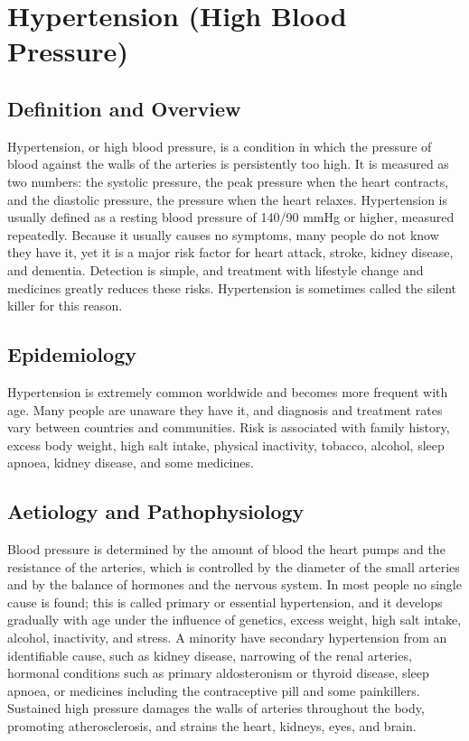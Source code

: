 \chapter{Hypertension (High Blood Pressure)}

\section*{Definition and Overview}
Hypertension, or high blood pressure, is a condition in which the pressure of blood against the walls of the arteries is persistently too high. It is measured as two numbers: the systolic pressure, the peak pressure when the heart contracts, and the diastolic pressure, the pressure when the heart relaxes. Hypertension is usually defined as a resting blood pressure of 140/90 mmHg or higher, measured repeatedly. Because it usually causes no symptoms, many people do not know they have it, yet it is a major risk factor for heart attack, stroke, kidney disease, and dementia. Detection is simple, and treatment with lifestyle change and medicines greatly reduces these risks. Hypertension is sometimes called the silent killer for this reason.

\section*{Epidemiology}
Hypertension is extremely common worldwide and becomes more frequent with age. Many people are unaware they have it, and diagnosis and treatment rates vary between countries and communities. Risk is associated with family history, excess body weight, high salt intake, physical inactivity, tobacco, alcohol, sleep apnoea, kidney disease, and some medicines.

\section*{Aetiology and Pathophysiology}
Blood pressure is determined by the amount of blood the heart pumps and the resistance of the arteries, which is controlled by the diameter of the small arteries and by the balance of hormones and the nervous system. In most people no single cause is found; this is called primary or essential hypertension, and it develops gradually with age under the influence of genetics, excess weight, high salt intake, alcohol, inactivity, and stress. A minority have secondary hypertension from an identifiable cause, such as kidney disease, narrowing of the renal arteries, hormonal conditions such as primary aldosteronism or thyroid disease, sleep apnoea, or medicines including the contraceptive pill and some painkillers. Sustained high pressure damages the walls of arteries throughout the body, promoting atherosclerosis, and strains the heart, kidneys, eyes, and brain.

